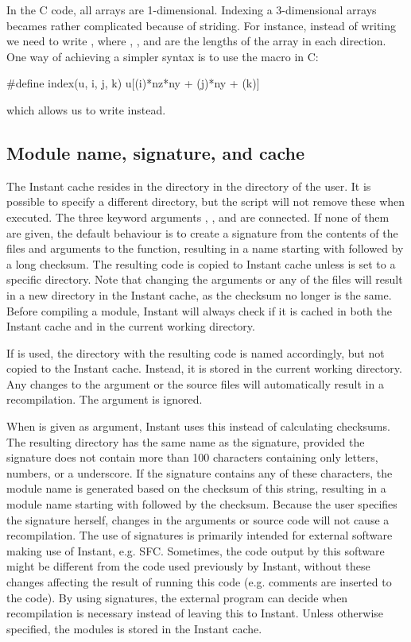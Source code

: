 In the C code, all arrays are 1-dimensional. Indexing a 3-dimensional arrays
becames rather complicated because of striding. For instance, instead of
writing  we need to write ,
where , , and  are the lengths of the array in each
direction. One way of achieving a simpler syntax is to use the 
macro in C:
\begin{code}
#define index(u, i, j, k) u[(i)*nz*ny + (j)*ny + (k)]
\end{code}
which allows us to write  instead.

\subsection{Module name, signature, and cache}\label{msc}
The Instant cache resides in the directory  in the
directory of the user. It is possible to specify a different directory, but the
 script will not remove these when executed.
The three keyword arguments , , and
 are connected. If none of them are given, the default behaviour is to
create a signature from the contents of the files and arguments to the
 function, resulting in a name starting with 
 followed by a long checksum. The
resulting code is copied to Instant cache unless  is set to
a specific directory. Note that changing the arguments or any of the files will
result in a new directory in the Instant cache, as the checksum no longer is
the same. Before compiling a module, Instant will always check if it is cached
in both the Instant cache and in the current working directory.

If  is used, the directory with the resulting code is named
accordingly, but not copied to the Instant cache. Instead, it is stored in the
current working directory. Any changes to the argument or the source files
will automatically result in a recompilation. The argument  is
ignored.

When  is given as argument, Instant uses this instead of
calculating checksums. The resulting directory has the same name as the
signature, provided the signature does not contain more than 100 characters
containing only letters, numbers, or a underscore. If the signature contains
any of these characters, the module name is generated based on the checksum of
this string, resulting in a module name starting with 
followed by the checksum. Because the user specifies the
signature herself, changes in the arguments or source code will not cause a
recompilation. The use of signatures is primarily intended for external
software making use of Instant, e.g. SFC. Sometimes, the code output by this
software might be different from the code used previously by Instant, without
these changes affecting the result of running this code (e.g. comments are
inserted to the code). By using signatures, the external program can decide
when recompilation is necessary instead of leaving this to Instant. Unless
otherwise specified, the modules is stored in the Instant cache.

